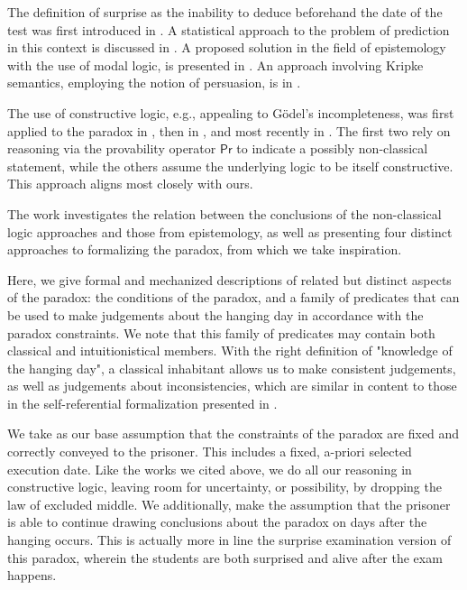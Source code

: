 \documentclass[runningheads]{llncs}
\begin{document}
The definition of surprise as the inability to deduce beforehand the date of the test
was first introduced in \cite{prediction}. A statistical approach to the problem
of prediction in this context is discussed in \cite{statistical}.
A proposed solution in the field of epistemology with the use of modal
logic, is presented in \cite{modalepistemic}. An approach involving
Kripke semantics, employing the notion of persuasion, is in \cite{kripkemodal}.

The use of constructive logic,
e.g., appealing to G\"{o}del's incompleteness, was first applied to the
paradox in \cite{goedelized}, then in \cite{godelinconsistent}, and most recently
in \cite{constructive} \cite{nonpredet}. The first two rely on reasoning via the provability operator $\mathsf{Pr}$ to indicate
a possibly non-classical statement, while the others assume the underlying logic to be itself
constructive. This approach aligns most closely with ours.

The work \cite{fourpossible} investigates the relation between the conclusions
of the non-classical logic approaches and those from epistemology, as well
as presenting four distinct approaches to formalizing the paradox, from which
we take inspiration.

Here, we give formal and mechanized descriptions of related but distinct aspects of the
paradox: the conditions of the
paradox, and a family of predicates that can be used to make judgements about the hanging day
in accordance with the paradox constraints. We note that this family of predicates
may contain both classical and intuitionistical members. With the
right definition of "knowledge of the hanging day", a classical inhabitant allows us
to make consistent judgements, as well as judgements about inconsistencies,
which are similar in content to those in the self-referential formalization presented
in \cite{godelinconsistent}.

We take as our base assumption that the constraints of the paradox are
fixed and correctly conveyed to the prisoner. This includes a fixed, a-priori selected execution date.
Like the works we cited above, we do all our reasoning in constructive logic,
leaving room for uncertainty, or possibility, by
dropping the law of excluded middle. We additionally, make the assumption that
the prisoner is able to continue drawing conclusions about the paradox on days
after the hanging occurs. This is actually more in line the surprise examination version of this paradox,
wherein the students are both surprised and alive after the exam happens.
\end{document}
